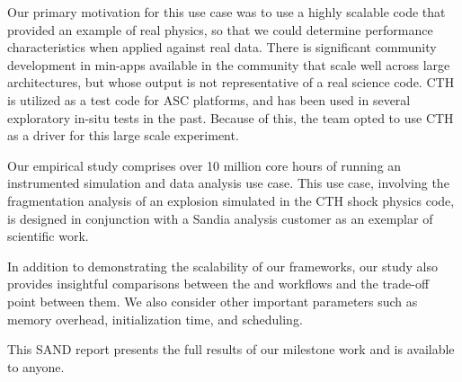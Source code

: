 Our primary motivation for this use case was to use a highly scalable code that
provided an example of real physics, so that we could determine performance
characteristics when applied against real data.  There is significant community
development in min-apps available in the community that scale well across large
architectures, but whose output is not representative of a real science code.
CTH is utilized as a test code for ASC platforms, and has been used in several
exploratory in-situ tests in the past.  Because of this, the team opted to use
CTH as a driver for this large scale experiment. 

Our empirical study comprises over 10 million core hours of running an
instrumented simulation and data analysis use case.  This use case, involving
the fragmentation analysis of an explosion simulated in the CTH shock
physics code, is designed in conjunction with a Sandia analysis customer as
an exemplar of scientific work.

In addition to demonstrating the scalability of our frameworks, our study
also provides insightful comparisons between the \insitu and \intransit
workflows and the trade-off point between them.  We also consider other
important parameters such as memory overhead, initialization time, and
scheduling.

This SAND report presents the full results of our milestone work and is
available to anyone.

